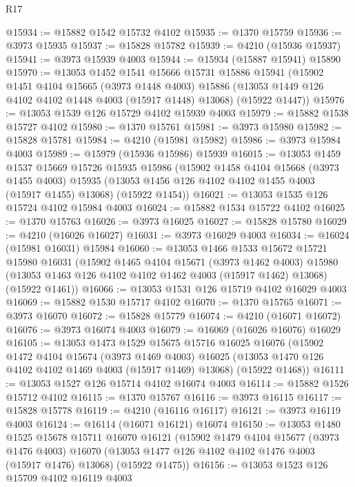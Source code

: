 \begin{lexlean}{R17}
\begin{coremodule}
@15934 := @15882 @1542 @15732 @4102
@15935 := @1370 @15759
@15936 := @3973 @15935
@15937 := @15828 @15782
@15939 := @4210 (@15936 @15937)
@15941 := @3973 @15939 @4003
@15944 := @15934 (@15887 @15941) @15890
@15970 := @13053
    @1452
    @1541
    @15666
    @15731
    @15886
    @15941
    (@15902
      @1451
      @4104
      @15665
      (@3973 @1448 @4003)
      @15886
      (@13053 @1449 @126 @4102 @4102 @1448 @4003 (@15917 @1448) @13068)
      (@15922 @1447))
@15976 := @13053 @1539 @126 @15729 @4102 @15939 @4003
@15979 := @15882 @1538 @15727 @4102
@15980 := @1370 @15761
@15981 := @3973 @15980
@15982 := @15828 @15781
@15984 := @4210 (@15981 @15982)
@15986 := @3973 @15984 @4003
@15989 := @15979 (@15936 @15986) @15939
@16015 := @13053
    @1459
    @1537
    @15669
    @15726
    @15935
    @15986
    (@15902
      @1458
      @4104
      @15668
      (@3973 @1455 @4003)
      @15935
      (@13053 @1456 @126 @4102 @4102 @1455 @4003 (@15917 @1455) @13068)
      (@15922 @1454))
@16021 := @13053 @1535 @126 @15724 @4102 @15984 @4003
@16024 := @15882 @1534 @15722 @4102
@16025 := @1370 @15763
@16026 := @3973 @16025
@16027 := @15828 @15780
@16029 := @4210 (@16026 @16027)
@16031 := @3973 @16029 @4003
@16034 := @16024 (@15981 @16031) @15984
@16060 := @13053
    @1466
    @1533
    @15672
    @15721
    @15980
    @16031
    (@15902
      @1465
      @4104
      @15671
      (@3973 @1462 @4003)
      @15980
      (@13053 @1463 @126 @4102 @4102 @1462 @4003 (@15917 @1462) @13068)
      (@15922 @1461))
@16066 := @13053 @1531 @126 @15719 @4102 @16029 @4003
@16069 := @15882 @1530 @15717 @4102
@16070 := @1370 @15765
@16071 := @3973 @16070
@16072 := @15828 @15779
@16074 := @4210 (@16071 @16072)
@16076 := @3973 @16074 @4003
@16079 := @16069 (@16026 @16076) @16029
@16105 := @13053
    @1473
    @1529
    @15675
    @15716
    @16025
    @16076
    (@15902
      @1472
      @4104
      @15674
      (@3973 @1469 @4003)
      @16025
      (@13053 @1470 @126 @4102 @4102 @1469 @4003 (@15917 @1469) @13068)
      (@15922 @1468))
@16111 := @13053 @1527 @126 @15714 @4102 @16074 @4003
@16114 := @15882 @1526 @15712 @4102
@16115 := @1370 @15767
@16116 := @3973 @16115
@16117 := @15828 @15778
@16119 := @4210 (@16116 @16117)
@16121 := @3973 @16119 @4003
@16124 := @16114 (@16071 @16121) @16074
@16150 := @13053
    @1480
    @1525
    @15678
    @15711
    @16070
    @16121
    (@15902
      @1479
      @4104
      @15677
      (@3973 @1476 @4003)
      @16070
      (@13053 @1477 @126 @4102 @4102 @1476 @4003 (@15917 @1476) @13068)
      (@15922 @1475))
@16156 := @13053 @1523 @126 @15709 @4102 @16119 @4003

\end{coremodule}
\end{lexlean}
